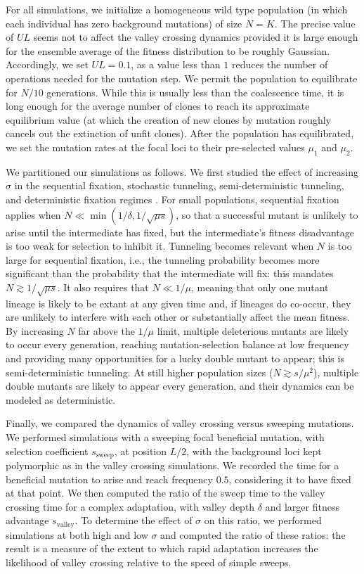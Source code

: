 \documentclass[10pt,twocolumn,twoside]{gsajnl}
\begin{document}
\begin{spacing}{1.5}
For all simulations, we initialize a homogeneous wild type population (in which each individual has zero background mutations) of size $N = K$.
The precise value of $UL$ seems not to affect the valley crossing dynamics provided it is large enough for the ensemble average of the fitness distribution to be roughly Gaussian.
Accordingly, we set $UL = 0.1$, as a value less than $1$ reduces the number of operations needed for the mutation step.
We permit the population to equilibrate for $N/10$ generations.
While this is usually less than the coalescence time, it is long enough for the average number of clones to reach its approximate equilibrium value (at which the creation of new clones by mutation roughly cancels out the extinction of unfit clones).
After the population has equilibrated, we set the mutation rates at the focal loci to their pre-selected values $\mu_1$ and $\mu_2$.

We partitioned our simulations as follows.
We first studied the effect of increasing $\sigma$ in the sequential fixation, stochastic tunneling, semi-deterministic tunneling, and deterministic fixation regimes \citep{weissman_2009}.
For small populations, sequential fixation applies when $N \ll \min(1/\delta, 1/\sqrt{\mu s})$, so that a successful mutant is unlikely to arise until the intermediate has fixed, but the intermediate's fitness disadvantage is too weak for selection to inhibit it.
Tunneling becomes relevant when $N$ is too large for sequential fixation, i.e., the tunneling probability becomes more significant than the probability that the intermediate will fix: this mandates $N \gtrsim 1/\sqrt{\mu s}$.
It also requires that $N \ll 1/\mu$, meaning that only one mutant lineage is likely to be extant at any given time and, if lineages do co-occur, they are unlikely to interfere with each other or substantially affect the mean fitness.
By increasing $N$ far above the $1/\mu$ limit, multiple deleterious mutants are likely to occur every generation, reaching mutation-selection balance at low frequency and providing many opportunities for a lucky double mutant to appear; this is semi-deterministic tunneling.
At still higher population sizes ($N \gtrsim s/\mu^2$), multiple double mutants are likely to appear every generation, and their dynamics can be modeled as deterministic.

Finally, we compared the dynamics of valley crossing versus sweeping mutations.
We performed simulations with a sweeping focal beneficial mutation, with selection coefficient $s_{\mathrm{sweep}}$, at position $L/2$, with the background loci kept polymorphic as in the valley crossing simulations.
We recorded the time for a beneficial mutation to arise and reach frequency $0.5$, considering it to have fixed at that point.
We then computed the ratio of the sweep time to the valley crossing time for a complex adaptation, with valley depth $\delta$ and larger fitness advantage $s_{\mathrm{valley}}$.
To determine the effect of $\sigma$ on this ratio, we performed simulations at both high and low $\sigma$ and computed the ratio of these ratios: the result is a measure of the extent to which rapid adaptation increases the likelihood of valley crossing relative to the speed of simple sweeps.


\end{spacing}
\end{document}
